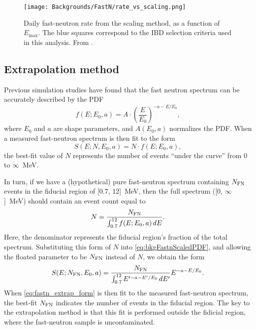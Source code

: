 \documentclass[../thesis.tex]{subfiles}
\begin{document}

\begin{figure}[h]
  \texttt{[image: Backgrounds/FastN/rate\_vs\_scaling.png]}
  \caption{Daily fast-neutron rate from the scaling method, as a function of $E_{\mathrm{max}}$. The blue squares correspond to the IBD selection criteria used in this analysis. From \cite{fastn}.}
  \label{fig:fastn_rate_vs_scaling}
\end{figure}

\subsection{Extrapolation method}
\label{sec:fastn_extrap}

Previous simulation studies have found that the fast neutron spectrum can be accurately described by the PDF
\begin{equation}
  \label{eq:bkgFastnShape}
  f(E; E_0, a) = A \cdot \left( \frac{E}{E_0} \right)^{-a-E/E_0},  
\end{equation}
where $E_0$ and $a$ are shape parameters, and $A(E_0, a)$ normalizes the PDF. When a measured fast-neutron spectrum is then fit to the form
\begin{equation}
  \label{eq:bkgFastnScaledPDF}
  S(E; N, E_0, a) = N \cdot f(E; E_0, a),
\end{equation}
the best-fit value of $N$ represents the number of events ``under the curve'' from 0 to $\infty$~MeV.

In turn, if we have a (hypothetical) pure fast-neutron spectrum containing $N_\mathrm{FN}$ events in the fiducial region of [0.7, 12]~MeV, then the full spectrum ([0, $\infty$]~MeV) should contain an event count equal to
\begin{equation}
  N = \frac{N_\mathrm{FN}}{\int_{0.7}^{12} f(E; E_0, a)\,dE }.
\end{equation}
Here, the denominator represents the fiducial region's fraction of the total spectrum. Substituting this form of $N$ into \autoref{eq:bkgFastnScaledPDF}, and allowing the floated parameter to be $N_\mathrm{FN}$ instead of $N$, we obtain the form
\begin{equation}
  \label{eq:fastn_extrap_form}
  S(E; \nfn, E_0, a) = \frac{\nfn}%
  {\int_{0.7}^{12} E'^{-a-E'/E_0} \, dE'} E^{-a-E/E_0}.
\end{equation}
When \autoref{eq:fastn_extrap_form} is then fit to the measured fast-neutron spectrum, the best-fit $N_\mathrm{FN}$ indicates the number of events in the fiducial region. The key to the extrapolation method is that this fit is performed outside the fidicial region, where the fast-neutron sample is uncontaminated.
\end{document}
